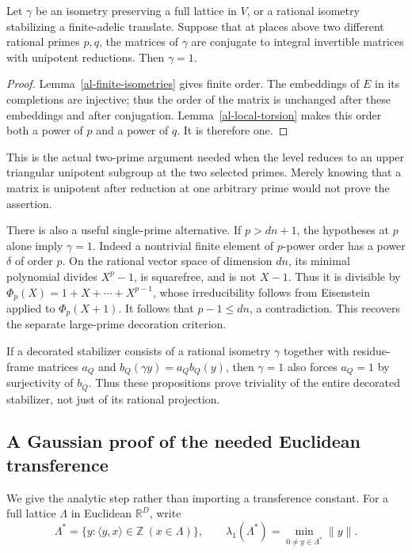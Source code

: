 \begin{proposition}
\label{al-two-primes}
Let $\gamma$ be an isometry preserving a full lattice in $V$,
or a rational isometry stabilizing a finite-adelic translate.
Suppose that at places above two different rational primes $p,q$,
the matrices of $\gamma$ are conjugate to integral invertible
matrices with unipotent reductions. Then $\gamma=1$.
\end{proposition}
\begin{proof}
Lemma~\ref{al-finite-isometries} gives finite order.
The embeddings of $E$ in its completions are injective; thus
the order of the matrix is unchanged after these embeddings
and after conjugation. Lemma~\ref{al-local-torsion} makes this
order both a power of $p$ and a power of $q$. It is therefore one.
\end{proof}

This is the actual two-prime argument needed when the level
reduces to an upper triangular unipotent subgroup at the two
selected primes. Merely knowing that a matrix is unipotent after
reduction at one arbitrary prime would not prove the assertion.

There is also a useful single-prime alternative. If $p>dn+1$,
the hypotheses at $p$ alone imply $\gamma=1$.
Indeed a nontrivial finite element of $p$-power order has a power
$\delta$ of order $p$. On the rational vector space of dimension
$dn$, its minimal polynomial divides $X^p-1$, is squarefree, and
is not $X-1$. Thus it is divisible by
$\Phi_p(X)=1+X+\cdots+X^{p-1}$, whose irreducibility follows
from Eisenstein applied to $\Phi_p(X+1)$.
It follows that $p-1\leq dn$, a contradiction.
This recovers the separate large-prime decoration criterion.

If a decorated stabilizer consists of a rational isometry
$\gamma$ together with residue-frame matrices $a_Q$ and
$b_Q(\gamma y)=a_Qb_Q(y)$, then $\gamma=1$ also forces
$a_Q=1$ by surjectivity of $b_Q$. Thus these propositions prove
triviality of the entire decorated stabilizer, not just of its
rational projection.

\subsection{A Gaussian proof of the needed Euclidean transference}

We give the analytic step rather than importing a transference
constant. For a full lattice $\Lambda$ in Euclidean
$\mathbb R^D$, write
\[
 \Lambda^*=\{y:\langle y,x\rangle\in\mathbb Z\ (x\in\Lambda)\},
 \qquad
 \lambda_1(\Lambda^*)=\min_{0\ne y\in\Lambda^*}\|y\|.
\]

